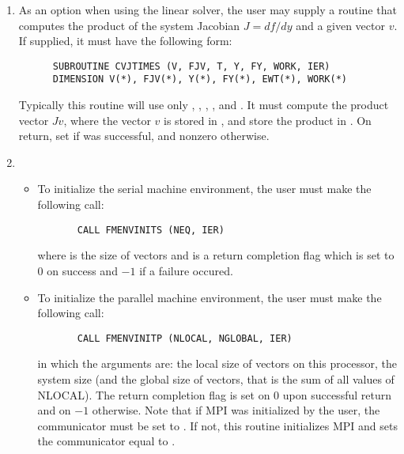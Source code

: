 \begin{enumerate}
\item
  As an option when using the  linear solver, the user may supply a 
  routine that computes the product of the system Jacobian $J = df/dy$ and 
  a given vector $v$.  If supplied, it must have the following form:
\begin{verbatim}
      SUBROUTINE CVJTIMES (V, FJV, T, Y, FY, WORK, IER)
      DIMENSION V(*), FJV(*), Y(*), FY(*), EWT(*), WORK(*)
\end{verbatim}
  Typically this routine will use only , , , , and .
  It must compute the product vector $Jv$, where the vector $v$ is stored in , 
  and store the product in .  On return, set  if 
  was successful, and nonzero otherwise.
  
\item 
  \begin{itemize}
  \item {\s}
    To initialize the serial machine environment, the user must make
    the following call:
\begin{verbatim}
       CALL FMENVINITS (NEQ, IER)
\end{verbatim}
    where  is the size of vectors and
     is a  return completion flag which is set to $0$ on success and $-1$ 
    if a failure occured.
    
  \item {\p}
    To initialize the parallel machine environment, the user must make 
    the following call:
\begin{verbatim}
       CALL FMENVINITP (NLOCAL, NGLOBAL, IER)
\end{verbatim}
    in which the arguments are:  the local size of vectors on this processor,
     the system size (and the global size of vectors, that is the sum 
    of all values of NLOCAL). The return completion flag  is set on $0$ upon
    successful return and on $-1$ otherwise.
    Note that if MPI was initialized by the user, the communicator must be
    set to .  If not, this routine initializes MPI and sets
    the communicator equal to .
  \end{itemize}
  

\end{enumerate}
